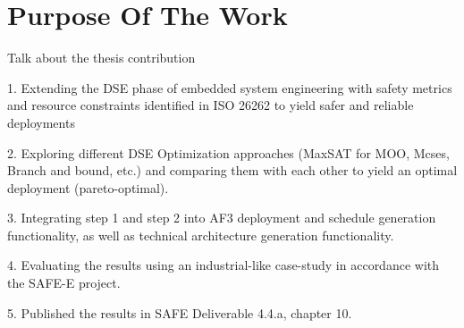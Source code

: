 \chapter{Purpose Of The Work}\label{chapter:pow}

Talk about the thesis contribution

1. Extending the DSE phase of embedded system engineering with safety metrics and resource constraints identified in ISO 26262 to yield safer and reliable deployments

2. Exploring different DSE Optimization approaches (MaxSAT for MOO, Mcses, Branch and bound, etc.) and comparing them with each other to yield an optimal deployment (pareto-optimal).

3. Integrating step 1 and step 2 into AF3 deployment and schedule generation functionality, as well as technical architecture generation functionality. 

4. Evaluating the results using an industrial-like case-study in accordance with the SAFE-E project. 

5. Published the results in SAFE Deliverable 4.4.a, chapter 10.